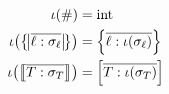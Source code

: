 \begin{align*}
\iota(\ssized) &= \sint \\ 
\iota \left(\sproducttype{\overline{\ell : \sigma_\ell}} \right) &= \srecordtype{\overline{\ell : \iota(\sigma_\ell)}} \\
\iota \left(\sconcattype{\overline{T : \sigma_T}} \right) &= \svarianttype{\overline{T : \iota(\sigma_T)}}
\end{align*}